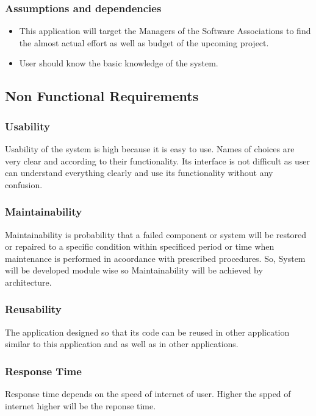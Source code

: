 \subsubsection{Assumptions and dependencies}
\begin{center}
    \begin{itemize}
        \item This application will target the Managers of the Software Associations to find the almost actual effort as well as budget of the upcoming project.
        \item User should know the basic knowledge of the system.
    \end{itemize}
\end{center}
\subsection{Non Functional Requirements}
\subsubsection{Usability}
Usability of the system is high because it is easy to use. Names of choices are very clear and according to their functionality. Its interface is not difficult as user can understand
everything clearly and use its functionality without any confusion.  
\subsubsection{Maintainability}
Maintainability is probability that a failed component or system will be restored or repaired to a specific condition within specificed period or time when maintenance is performed in acoordance with prescribed procedures. So, System will be developed module wise so Maintainability will be achieved by architecture.
\subsubsection{Reusability}
The application designed so that its code can be reused in other application similar to this application and as well as in other applications.
\subsubsection{Response Time}
Response time depends on the speed of internet of user. Higher the spped of internet higher will be the reponse time.
